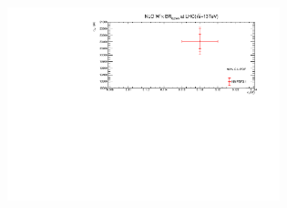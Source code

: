 \begin{figure}[H]
\centering
\begin{subfigure}{0.49\textwidth}
\includegraphics[height=5.6cm, width=\textwidth]{chapter4/Wnlo13.pdf}
\vspace*{-6mm}
\caption{}
\label{wnlo}


\end{subfigure}
\end{figure}
